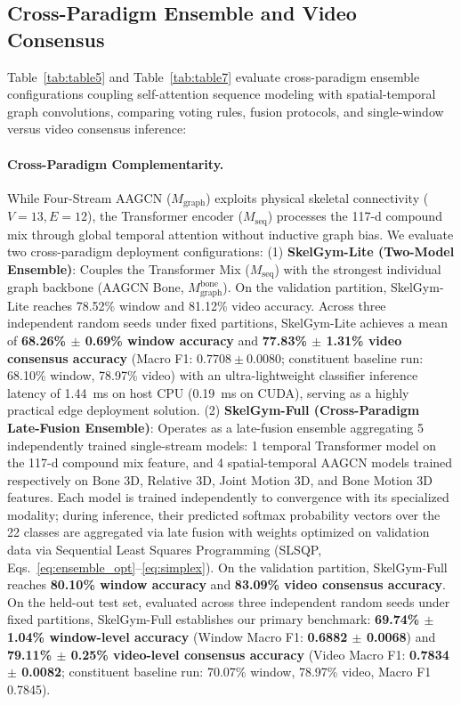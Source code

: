 \documentclass[preprint,12pt]{elsarticle}
\begin{document}
\subsection{Cross-Paradigm Ensemble and Video Consensus}
Table~\ref{tab:table5} and Table~\ref{tab:table7} evaluate cross-paradigm ensemble configurations coupling self-attention sequence modeling with spatial-temporal graph convolutions, comparing voting rules, fusion protocols, and single-window versus video consensus inference:

\paragraph{Cross-Paradigm Complementarity.} While Four-Stream AAGCN ($M_{\text{graph}}$) exploits physical skeletal connectivity ($V=13, E=12$), the Transformer encoder ($M_{\text{seq}}$) processes the 117-d compound mix through global temporal attention without inductive graph bias. We evaluate two cross-paradigm deployment configurations:
(1) \textbf{SkelGym-Lite (Two-Model Ensemble)}: Couples the Transformer Mix ($M_{\text{seq}}$) with the strongest individual graph backbone (AAGCN Bone, $M_{\text{graph}}^{\text{bone}}$). On the validation partition, SkelGym-Lite reaches 78.52\% window and 81.12\% video accuracy. Across three independent random seeds under fixed partitions, SkelGym-Lite achieves a mean of \textbf{68.26\% $\pm$ 0.69\% window accuracy} and \textbf{77.83\% $\pm$ 1.31\% video consensus accuracy} (Macro F1: $0.7708 \pm 0.0080$; constituent baseline run: 68.10\% window, 78.97\% video) with an ultra-lightweight classifier inference latency of 1.44~ms on host CPU (0.19~ms on CUDA), serving as a highly practical edge deployment solution.
(2) \textbf{SkelGym-Full (Cross-Paradigm Late-Fusion Ensemble)}: Operates as a late-fusion ensemble aggregating 5 independently trained single-stream models: 1 temporal Transformer model on the 117-d compound mix feature, and 4 spatial-temporal AAGCN models trained respectively on Bone 3D, Relative 3D, Joint Motion 3D, and Bone Motion 3D features. Each model is trained independently to convergence with its specialized modality; during inference, their predicted softmax probability vectors over the 22 classes are aggregated via late fusion with weights optimized on validation data via Sequential Least Squares Programming (SLSQP, Eqs.~\eqref{eq:ensemble_opt}--\eqref{eq:simplex}). On the validation partition, SkelGym-Full reaches \textbf{80.10\% window accuracy} and \textbf{83.09\% video consensus accuracy}. On the held-out test set, evaluated across three independent random seeds under fixed partitions, SkelGym-Full establishes our primary benchmark: \textbf{69.74\% $\pm$ 1.04\% window-level accuracy} (Window Macro F1: \textbf{0.6882 $\pm$ 0.0068}) and \textbf{79.11\% $\pm$ 0.25\% video-level consensus accuracy} (Video Macro F1: \textbf{0.7834 $\pm$ 0.0082}; constituent baseline run: 70.07\% window, 78.97\% video, Macro F1 0.7845).
\end{document}
